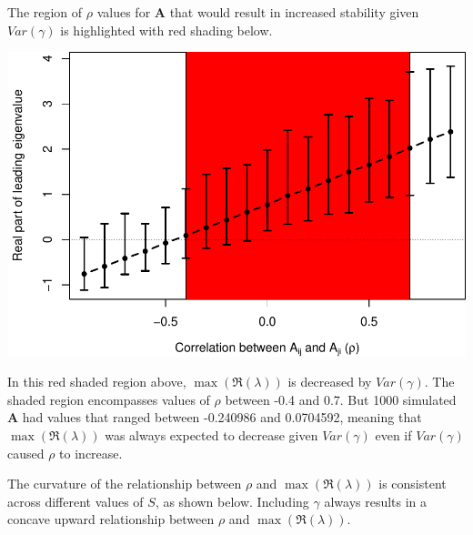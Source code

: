 \documentclass[]{article}
\begin{document}
The region of \(\rho\) values for \(\textbf{A}\) that would result in
increased stability given \(Var(\gamma)\) is highlighted with red
shading below.

\includegraphics{revision_notes_files/figure-latex/unnamed-chunk-9-1.pdf}

In this red shaded region above, \(\max(\Re(\lambda))\) is decreased by
\(Var(\gamma)\). The shaded region encompasses values of \(\rho\)
between -0.4 and 0.7. But 1000 simulated \(\textbf{A}\) had values that
ranged between -0.240986 and 0.0704592, meaning that
\(\max(\Re(\lambda))\) was always expected to decrease given
\(Var(\gamma)\) even if \(Var(\gamma)\) caused \(\rho\) to increase.

The curvature of the relationship between \(\rho\) and
\(\max(\Re(\lambda))\) is consistent across different values of \(S\),
as shown below. Including \(\gamma\) always results in a concave upward
relationship between \(\rho\) and \(\max(\Re(\lambda))\).
\end{document}
